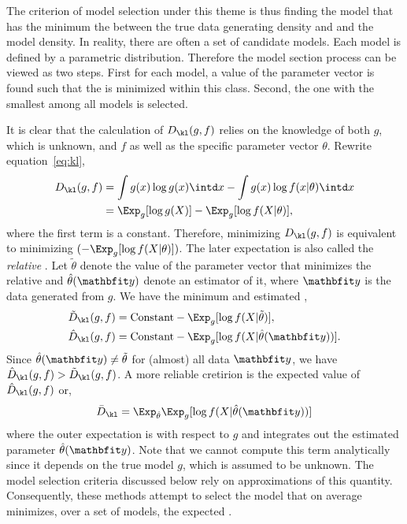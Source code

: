 The criterion of model selection under this theme is thus finding the model
that has the minimum the \kld between the true data generating density and
and the model density. In reality, there are often a set of candidate
models.  Each model is defined by a parametric distribution. Therefore the
model section process can be viewed as two steps. First for each model, a
value of the parameter vector is found such that the \kld is minimized within
this class.  Second, the one with the smallest \kld among all models is
selected.

It is clear that the calculation of $D_{\kl}(g,f)$ relies on the knowledge of
both $g$, which is unknown, and $f$ as well as the specific parameter vector
$\theta$. Rewrite equation~\eqref{eq:kl},
\begin{align}
  D_{\kl}(g,f)
  &= \int g(x)\log g(x) \intd x - \int g(x) \log f(x|\theta) \intd x \notag\\
  &= \Exp_g[\log g(X)] - \Exp_g[\log f(X|\theta)],
\end{align}
where the first term is a constant. Therefore, minimizing $D_{\kl}(g,f)$ is
equivalent to minimizing $(-\Exp_g[\log f(X|\theta)])$. The later expectation
is also called the \emph{relative} \kld. Let $\tilde\theta$ denote the value
of the parameter vector that minimizes the relative \kld and
$\hat\theta(\data)$ denote an estimator of it, where $\data$ is the data
generated from $g$. We have the minimum and estimated \kld,
\begin{align}
  \tilde{D}_{\kl}(g,f) &= \text{Constant} - \Exp_g[\log f(X|\tilde\theta)], \\
  \hat{D}_{\kl}(g,f) &= \text{Constant} - \Exp_g[\log f(X|\hat\theta(\data))].
\end{align}
Since $\hat\theta(\data)\ne\tilde\theta$ for (almost) all data $\data$, we
have $\hat{D}_{\kl}(g,f) > \tilde{D}_{\kl}(g,f)$. A more reliable cretirion
is the expected value of $\hat{D}_{\kl}(g,f)$ or,
\begin{equation}
  \bar{D}_{\kl} = \Exp_{\hat\theta}\Exp_g[\log f(X|\hat\theta(\data))]
  \label{eq:expected kl}
\end{equation}
where the outer expectation is with respect to $g$ and integrates out the
estimated parameter $\hat\theta(\data)$. Note that we cannot compute this term
analytically since it depends on the true model $g$, which is assumed to be
unknown. The model selection criteria discussed below rely on approximations
of this quantity. Consequently, these methods attempt to select the model
that on average minimizes, over a set of models, the expected \kld.

